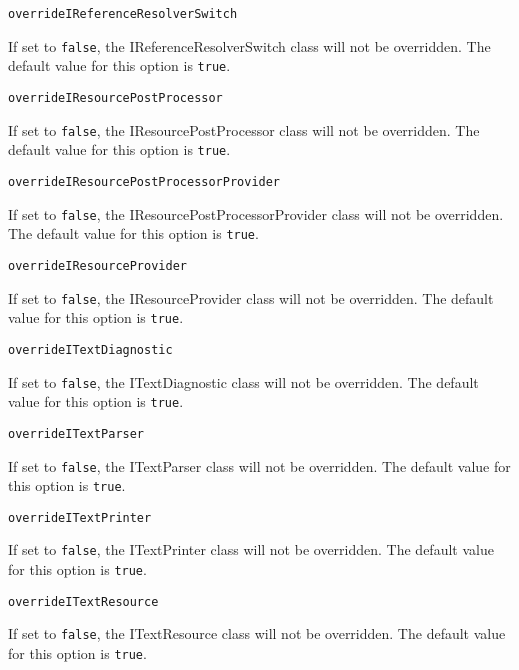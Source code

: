 \noindent\texttt{overrideIReferenceResolverSwitch}
\begin{myindentpar}{1cm}
If set to \texttt{false}, the IReferenceResolverSwitch class will not be overridden. The default value for this option is \texttt{true}.
\end{myindentpar}

\noindent\texttt{overrideIResourcePostProcessor}
\begin{myindentpar}{1cm}
If set to \texttt{false}, the IResourcePostProcessor class will not be overridden. The default value for this option is \texttt{true}.
\end{myindentpar}

\noindent\texttt{overrideIResourcePostProcessorProvider}
\begin{myindentpar}{1cm}
If set to \texttt{false}, the IResourcePostProcessorProvider class will not be overridden. The default value for this option is \texttt{true}.
\end{myindentpar}

\noindent\texttt{overrideIResourceProvider}
\begin{myindentpar}{1cm}
If set to \texttt{false}, the IResourceProvider class will not be overridden. The default value for this option is \texttt{true}.
\end{myindentpar}

\noindent\texttt{overrideITextDiagnostic}
\begin{myindentpar}{1cm}
If set to \texttt{false}, the ITextDiagnostic class will not be overridden. The default value for this option is \texttt{true}.
\end{myindentpar}

\noindent\texttt{overrideITextParser}
\begin{myindentpar}{1cm}
If set to \texttt{false}, the ITextParser class will not be overridden. The default value for this option is \texttt{true}.
\end{myindentpar}

\noindent\texttt{overrideITextPrinter}
\begin{myindentpar}{1cm}
If set to \texttt{false}, the ITextPrinter class will not be overridden. The default value for this option is \texttt{true}.
\end{myindentpar}

\noindent\texttt{overrideITextResource}
\begin{myindentpar}{1cm}
If set to \texttt{false}, the ITextResource class will not be overridden. The default value for this option is \texttt{true}.
\end{myindentpar}

